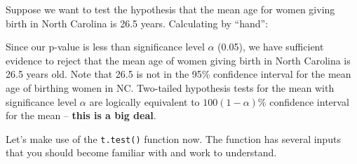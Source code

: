 \documentclass[]{book}
\newenvironment{Shaded}{\begin{snugshade}}{\end{snugshade}}
\newcommand{\KeywordTok}[1]{\textcolor[rgb]{0.13,0.29,0.53}{\textbf{{#1}}}}
\newcommand{\DataTypeTok}[1]{\textcolor[rgb]{0.13,0.29,0.53}{{#1}}}
\newcommand{\DecValTok}[1]{\textcolor[rgb]{0.00,0.00,0.81}{{#1}}}
\newcommand{\FloatTok}[1]{\textcolor[rgb]{0.00,0.00,0.81}{{#1}}}
\newcommand{\StringTok}[1]{\textcolor[rgb]{0.31,0.60,0.02}{{#1}}}
\newcommand{\CommentTok}[1]{\textcolor[rgb]{0.56,0.35,0.01}{\textit{{#1}}}}
\newcommand{\NormalTok}[1]{{#1}}
\theoremstyle{definition}
\theoremstyle{definition}
\theoremstyle{definition}
\theoremstyle{remark}
\begin{document}
Suppose we want to test the hypothesis that the mean age for women
giving birth in North Carolina is 26.5 years. Calculating by ``hand'':

\begin{Shaded}
\end{Shaded}

Since our p-value is less than significance level \(\alpha\) (0.05), we
have sufficient evidence to reject that the mean age of women giving
birth in North Carolina is 26.5 years old. Note that 26.5 is not in the
95\% confidence interval for the mean age of birthing women in NC.
Two-tailed hypothesis tests for the mean with significance level
\(\alpha\) are logically equivalent to \(100(1-\alpha)\%\) confidence
interval for the mean -- \textbf{this is a big deal}.

Let's make use of the \texttt{t.test()} function now. The function has
several inputs that you should become familiar with and work to
understand.

\begin{Shaded}
\end{Shaded}
\end{document}
